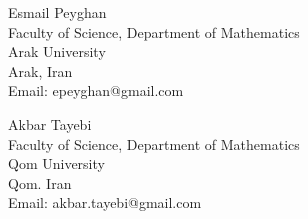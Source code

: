 \documentclass[10pt,a4paper]{article}
\theoremstyle{plain}
\theoremstyle{definition}
\begin{document}
\noindent
Esmail Peyghan\\
Faculty  of Science, Department of Mathematics\\
Arak University\\
Arak,  Iran\\
Email: epeyghan@gmail.com

\bigskip

\noindent
Akbar Tayebi\\
Faculty  of Science, Department of Mathematics\\
Qom University \\
Qom. Iran\\
Email: akbar.tayebi@gmail.com
\end{document}
